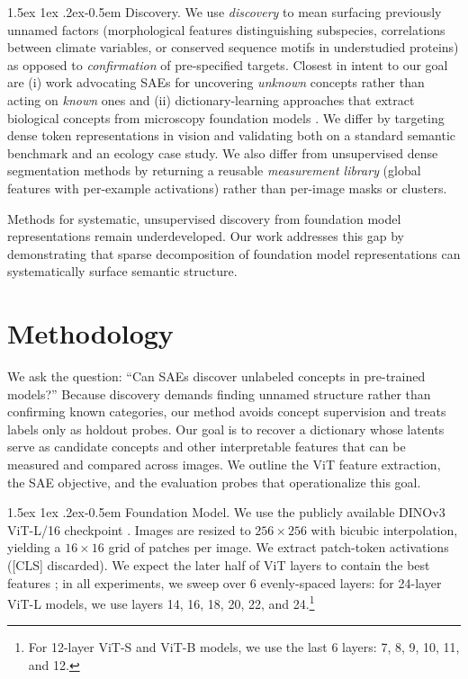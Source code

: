 \documentclass[10pt,twocolumn,letterpaper]{article}
\makeatletter
\renewcommand{\paragraph}{%
  \@startsection{paragraph}{4}%
  {\z@}{1.5ex \@plus 1ex \@minus .2ex}{-0.5em}%
  {\normalfont\normalsize\bfseries}%
}
\makeatother
\begin{document}
\paragraph{Discovery.}
We use \emph{discovery} to mean surfacing previously unnamed factors (morphological features distinguishing subspecies, correlations between climate variables, or conserved sequence motifs in understudied proteins) as opposed to \emph{confirmation} of pre-specified targets.
Closest in intent to our goal are (i) work advocating SAEs for uncovering \emph{unknown} concepts rather than acting on \emph{known} ones \citep{peng2025unknown} and (ii) dictionary-learning approaches that extract biological concepts from microscopy foundation models \citep{microscopy_dictionary_learning_2025}.
We differ by targeting dense token representations in vision and validating both on a standard semantic benchmark and an ecology case study.
We also differ from unsupervised dense segmentation methods \citep{lost2021,ji2021tokencut,stego2022,maskcut2022} by returning a reusable \emph{measurement library} (global features with per-example activations) rather than per-image masks or clusters.

Methods for systematic, unsupervised discovery from foundation model representations remain underdeveloped.
Our work addresses this gap by demonstrating that sparse decomposition of foundation model representations can systematically surface semantic structure.



\section{Methodology}

We ask the question: ``Can SAEs discover unlabeled concepts in pre-trained models?''
Because discovery demands finding unnamed structure rather than confirming known categories, our method avoids concept supervision and treats labels only as holdout probes.
Our goal is to recover a dictionary whose latents serve as candidate concepts and other interpretable features that can be measured and compared across images.
We outline the ViT feature extraction, the SAE objective, and the evaluation probes that operationalize this goal.

\paragraph{Foundation Model.} We use the publicly available DINOv3 ViT-L/16 checkpoint \citep{simeoni2025dinov3}.
Images are resized to $256\times256$ with bicubic interpolation, yielding a $16\times16$ grid of patches per image.
We extract patch-token activations ([CLS] discarded). 
We expect the later half of ViT layers to contain the best features \citep{bolya2025perceptionencoder}; in all experiments, we sweep over \num{6} evenly-spaced layers: for \num{24}-layer ViT-L models, we use layers \num{14}, \num{16}, \num{18}, \num{20}, \num{22}, and \num{24}.\footnote{For \num{12}-layer ViT-S and ViT-B models, we use the last \num{6} layers: \num{7}, \num{8}, \num{9}, \num{10}, \num{11}, and \num{12}.}
\end{document}
